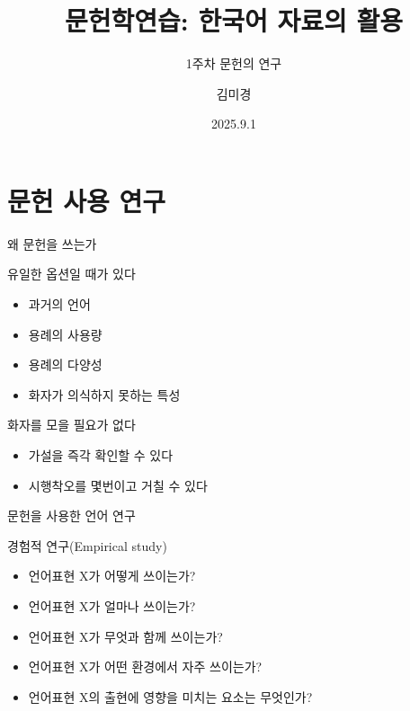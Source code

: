 \documentclass[11pt, aspectratio=169]{beamer}
\title[문헌학연습]{문헌학연습: 한국어 자료의 활용}
\subtitle{1주차 문헌의 연구}
\author{김미경}
\date{2025.9.1}
\begin{document}
\begin{frame}
  \titlepage
\end{frame}


\section{문헌 사용 연구}

\begin{frame}[t]{왜 문헌을 쓰는가}

  \begin{block}{유일한 옵션일 때가 있다}
    \begin{itemize}
      \item 과거의 언어
      \item 용례의 사용량
      \item 용례의 다양성
      \item 화자가 의식하지 못하는 특성
    \end{itemize}
  \end{block}

  \begin{block}{화자를 모을 필요가 없다}
    \begin{itemize}
      \item 가설을 즉각 확인할 수 있다
      \item 시행착오를 몇번이고 거칠 수 있다
    \end{itemize}    
  \end{block}
\end{frame}

\begin{frame}[t]{문헌을 사용한 언어 연구}
  \begin{block}{경험적 연구(Empirical study)}
    \begin{itemize}
      \item 언어표현 X가 어떻게 쓰이는가?
      \item 언어표현 X가 얼마나 쓰이는가?
      \item 언어표현 X가 무엇과 함께 쓰이는가?
      \item 언어표현 X가 어떤 환경에서 자주 쓰이는가?
      \item 언어표현 X의 출현에 영향을 미치는 요소는 무엇인가?
    \end{itemize}
  \end{block}  
\end{frame}
\end{document}
